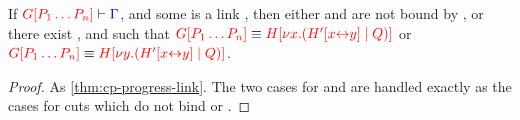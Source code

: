 \begin{lemmaB}\label{thm:nc-progress-link}
  If $\seq[{ \cpPlug{G}{P_1 \dots P_n} }]{ \Gamma }$, and some  is a
  link , then either  and  are not bound by
  , or there exist ,  and  such that
  $\tm{\cpPlug{G}{P_1 \dots P_n}} \equiv \tm{\cpPlug{H}{\cpCut{x}{\cpPlug{H'}{\cpLink{x}{y}}}{Q}}}$ or
  $\tm{\cpPlug{G}{P_1 \dots P_n}} \equiv \tm{\cpPlug{H}{\cpCut{y}{\cpPlug{H'}{\cpLink{x}{y}}}{Q}}}$.
\end{lemmaB}
\begin{proof}
  As \cref{thm:cp-progress-link}. The two cases for
  and
  are handled exactly as the cases for cuts which do not bind  or .
\end{proof}
